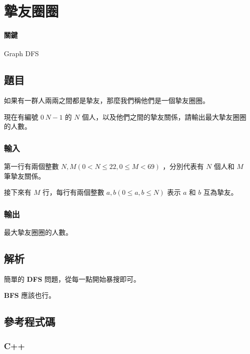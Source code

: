 \documentclass[a4paper,10pt]{article}
\begin{document}



% 

\section{摯友圈圈}

\paragraph{關鍵} Graph DFS

\subsection{題目}

如果有一群人兩兩之間都是摯友，那麼我們稱他們是一個摯友圈圈。

現在有編號 $0 ~ N-1$ 的 $N$ 個人，以及他們之間的摯友關係，請輸出最大摯友圈圈的人數。

\subsubsection{輸入}

第一行有兩個整數 $N, M (0 < N \leq 22, 0 \leq M < 69)$ ，分別代表有 $N$ 個人和 $M$ 筆摯友關係。

接下來有 $M$ 行，每行有兩個整數 $a, b (0 ≤ a, b ≤ N)$ 表示 $a$ 和 $b$ 互為摯友。

\subsubsection{輸出}

最大摯友圈圈的人數。

\subsection{解析}

簡單的 \textbf{DFS} 問題，從每一點開始暴搜即可。

\textbf{BFS} 應該也行。

\subsection{參考程式碼}

\subsubsection{C++}




% 
\end{document}
